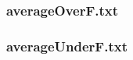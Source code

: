 \documentclass[12pt]{article}
\begin{document}
\subsubsection{averageOverF.txt}

\newpage
\subsubsection{averageUnderF.txt}

\newpage


\cite{*}
\end{document}
